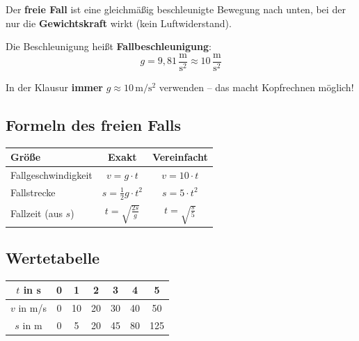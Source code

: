 \documentclass[11pt,a4paper]{article}
\begin{document}
\begin{merksatz}
Der \textbf{freie Fall} ist eine gleichmäßig beschleunigte Bewegung nach unten, bei der nur die \textbf{Gewichtskraft} wirkt (kein Luftwiderstand).

Die Beschleunigung heißt \textbf{Fallbeschleunigung}:
\[
g = 9{,}81\,\frac{\mathrm{m}}{\mathrm{s}^2} \approx \boxed{10\,\frac{\mathrm{m}}{\mathrm{s}^2}}
\]
\end{merksatz}

\begin{tipp}
In der Klausur \textbf{immer} $g \approx 10\,\mathrm{m/s^2}$ verwenden -- das macht Kopfrechnen möglich!
\end{tipp}

\subsection{Formeln des freien Falls}

\begin{formelbox}
\begin{center}
\renewcommand{\arraystretch}{1.8}
\begin{tabular}{|l|c|c|}
\hline
\rowcolor{lightblue}
\textbf{Größe} & \textbf{Exakt} & \textbf{Vereinfacht} \\
\hline
Fallgeschwindigkeit & $v = g \cdot t$ & $v = 10 \cdot t$ \\
\hline
Fallstrecke & $s = \frac{1}{2} g \cdot t^2$ & $s = 5 \cdot t^2$ \\
\hline
Fallzeit (aus $s$) & $t = \sqrt{\frac{2s}{g}}$ & $t = \sqrt{\frac{s}{5}}$ \\
\hline
\end{tabular}
\end{center}
\end{formelbox}

\subsection{Wertetabelle}

\begin{center}
\begin{tabular}{|c|c|c|c|c|c|c|}
\hline
\rowcolor{lightblue}
$t$ in s & 0 & 1 & 2 & 3 & 4 & 5 \\
\hline
$v$ in m/s & 0 & 10 & 20 & 30 & 40 & 50 \\
\hline
$s$ in m & 0 & 5 & 20 & 45 & 80 & 125 \\
\hline
\end{tabular}
\end{center}
\end{document}

